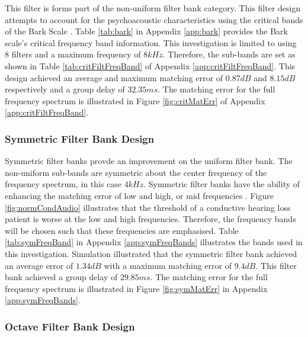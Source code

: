 \documentclass[12pt, onecolumn]{article}
\begin{document}
\noindent This filter is forms part of the non-uniform filter bank category. This filter design attempts to account for the psychoacoustic characteristics using the critical bands of the Bark Scale \cite{chong}. Table \ref{tab:bark} in Appendix \ref{app:bark} provides the Bark scale's critical frequency band information. This investigation is limited to using $8$ filters and a maximum frequency of $8kHz$. Therefore, the sub-bands are set as shown in Table \ref{tab:critFiltFreqBand} of Appendix \ref{app:critFiltFreqBand}.	This design achieved an average and maximum matching error of $0.87dB$ and $8.15dB$ respectively and a group delay of $32.35ms$. The matching error for the full frequency spectrum is illustrated in Figure \ref{fig:critMatErr} of Appendix \ref{app:critFiltFreqBand}.


\subsubsection{Symmetric Filter Bank Design}
\label{sec:symmDesign}

\noindent Symmetric filter banks provde an improvement on the uniform filter bank. The non-uniform sub-bands are symmetric about the center frequency of the frequency spectrum, in this case $4kHz$. Symmetric filter banks have the ability of enhancing the matching error of low and high, or mid frequencies \cite{sebastian}. Figure \ref{fig:normCondAudio} illustrates that the threshold of a conductive hearing loss patient is worse at the low and high frequencies. Therefore, the frequency bands will be chosen such that these frequencies are emphasised. Table \ref{tab:symFreqBand} in Appendix \ref{app:symFreqBands} illustrates the bands used in this investigation. Simulation illustrated that the symmetric filter bank achieved an average error of $1.34dB$ with a maximum matching error of $9.4dB$. This filter bank achieved a group delay of $29.85ms$. The matching error for the full frequency spectrum is illustrated in Figure \ref{fig:symMatErr} in Appendix \ref{app:symFreqBands}.


\subsubsection{Octave Filter Bank Design}
\label{sec:octDesign}
\end{document}
